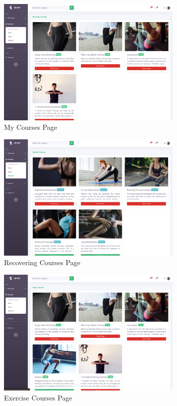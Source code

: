 \documentclass[16pt]{scrreprt}
\begin{document}
\begin{figure}[H]
	\centering
	\includegraphics[width=0.8\textwidth]{diagrams/mine.png}
	\caption{My Courses Page}
\end{figure}

\begin{figure}[H]
	\centering
	\includegraphics[width=0.8\textwidth]{diagrams/rebuild.png}
	\caption{Recovering Courses Page}
\end{figure}

\begin{figure}[H]
	\centering
	\includegraphics[width=0.8\textwidth]{diagrams/keep.png}
	\caption{Exercise Courses Page}
\end{figure}
\end{document}
